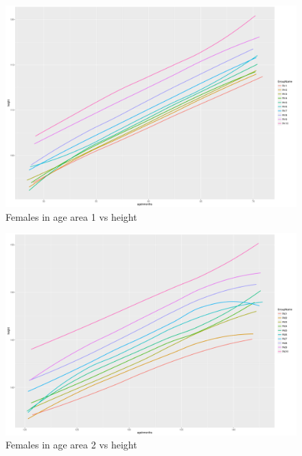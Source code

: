 \documentclass{article}
\begin{document}
\begin{figure}[H]
	\begin{center}
		\includegraphics[scale = 0.4]{femaleage1.png}
	\end{center}
	\caption{Females in age area 1 vs height}
\end{figure}

\begin{figure}[H]
	\begin{center}
		\includegraphics[scale = 0.4]{femaleage2.png}
	\end{center}
	\caption{Females in age area 2 vs height}
\end{figure}  
\end{document}
